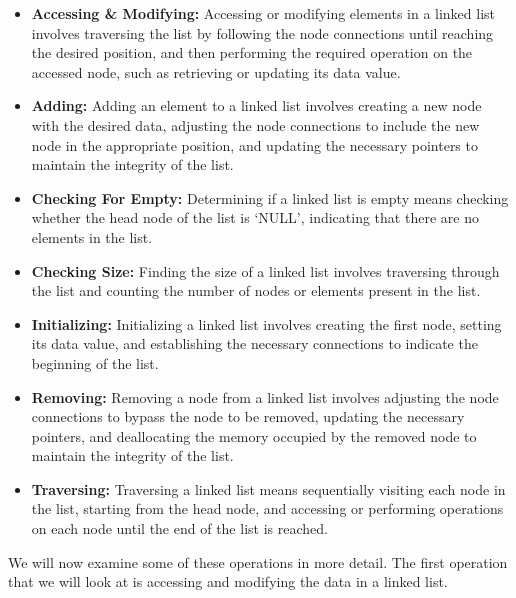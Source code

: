 \begin{itemize}
    \item \textbf{Accessing \& Modifying:} Accessing or modifying elements in a linked list involves traversing the list by following the node connections until reaching the desired position, and then 
    performing the required operation on the accessed node, such as retrieving or updating its data value.
    \item \textbf{Adding:} Adding an element to a linked list involves creating a new node with the desired data, adjusting the node connections to include the new node in the appropriate position, 
    and updating the necessary pointers to maintain the integrity of the list.
    \item \textbf{Checking For Empty:} Determining if a linked list is empty means checking whether the head node of the list is `NULL', indicating that there are no elements in the list.
    \item \textbf{Checking Size:} Finding the size of a linked list involves traversing through the list and counting the number of nodes or elements present in the list.
    \item \textbf{Initializing:} Initializing a linked list involves creating the first node, setting its data value, and establishing the necessary connections to indicate the beginning of the list.
    \item \textbf{Removing:} Removing a node from a linked list involves adjusting the node connections to bypass the node to be removed, updating the necessary pointers, and deallocating the memory 
    occupied by the removed node to maintain the integrity of the list.
    \item \textbf{Traversing:} Traversing a linked list means sequentially visiting each node in the list, starting from the head node, and accessing or performing operations on each node until the end 
    of the list is reached.
\end{itemize}

We will now examine some of these operations in more detail. The first operation that we will look at is accessing and modifying the data in a linked list.

